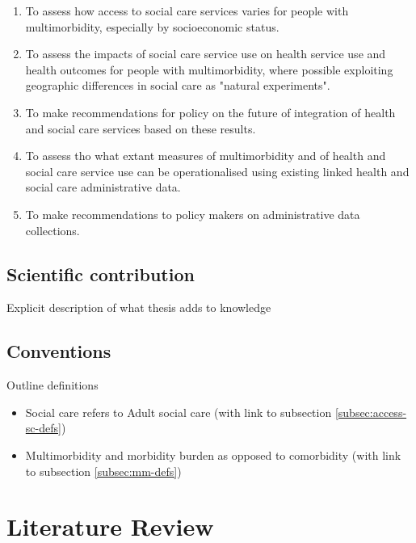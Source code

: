 \documentclass[12pt,]{report}
\providecommand{\tightlist}{%
  \setlength{\itemsep}{0pt}\setlength{\parskip}{0pt}}
\begin{document}
\begin{enumerate}[noitemsep]
\item To assess how access to social care services varies for people with multimorbidity, especially by socioeconomic status.  
\item To assess the impacts of social care service use on health service use and health outcomes for people with multimorbidity, where possible exploiting geographic differences in social care as "natural experiments".
\item To make recommendations for policy on the future of integration of health and social care services based on these results.
\item To assess tho what extant measures of multimorbidity and of health and social care service use can be operationalised using existing linked health and social care administrative data.
\item To make recommendations to policy makers on administrative data collections. 
\end{enumerate}

\section{Scientific contribution}\label{sec:intro-contribution}

Explicit description of what thesis adds to knowledge

\section{Conventions}\label{sec:intro-conventions}

Outline definitions

\begin{itemize}
\tightlist
\item
  Social care refers to Adult social care (with link to subsection
  \ref{subsec:access-sc-defs})
\item
  Multimorbidity and morbidity burden as opposed to comorbidity (with
  link to subsection \ref{subsec:mm-defs})
\end{itemize}

\FloatBarrier
\newpage
{}

\chapter{Literature Review}\label{ch:lit-review}
\end{document}
